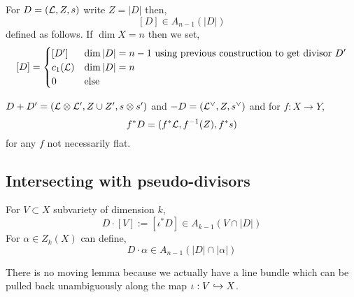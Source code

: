 \documentclass[12pt]{article}
\begin{document}
\begin{defn}
For $D = (\mathcal{L}, Z, s)$ write $Z = |D|$ then,
\[ [D] \in A_{n-1}(|D|) \]
defined as follows. If $\dim{X} = n$ then we set,
\[ [D] = 
\begin{cases}
[D'] & \dim{|D|} = n - 1 \text{ using previous construction to get divisor } D'
\\
c_1(\mathcal{L}) & \dim{|D|} = n
\\
0 & \text{else}
\end{cases} \]
\end{defn}

\begin{defn}
$D + D' = (\mathcal{L} \otimes \mathcal{L}', Z \cup Z', s \otimes s')$ and $-D = (\mathcal{L}^\vee, Z, s^\vee)$ and for $f : X \to Y$,
\[ f^* D = (f^* \mathcal{L}, f^{-1}(Z), f^* s) \]
for any $f$ not necessarily flat.
\end{defn}

\subsection{Intersecting with pseudo-divisors}

\begin{defn}
For $V \subset X$ subvariety of dimension $k$, 
\[ D \cdot [V] := [\iota^* D] \in A_{k-1}(V \cap |D|) \]
For $\alpha \in Z_k(X)$ can define,
\[ D \cdot \alpha \in A_{n-1}(|D| \cap |\alpha|) \]
\end{defn}

\begin{rmk}
There is no moving lemma because we actually have a line bundle which can be pulled back unambiguously along the map $\iota : V \hookrightarrow X$.
\end{rmk}

\begin{prop}
\end{prop}
\end{document}
